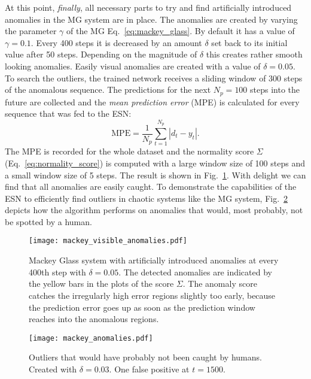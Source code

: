At this point, \emph{finally}, all necessary parts to try and find artificially
introduced anomalies in the MG system are in place. The anomalies are created
by varying the parameter $\gamma$ of the MG Eq.~\ref{eq:mackey_glass}.  By
default it has a value of $\gamma = 0.1$.  Every 400 steps it is decreased by
an amount $\delta$ set back to its initial value after 50 steps. Depending on
the magnitude of $\delta$ this creates rather smooth looking anomalies. Easily
visual anomalies are created with a value of $\delta = 0.05$. To search the
outliers, the trained network receives a sliding window of 300 steps of the
anomalous sequence.  The predictions for the next $N_p = 100$ steps into the
future are collected and the \emph{mean prediction error} (MPE) is calculated
for every sequence that was fed to the ESN:
\begin{equation}
  \text{MPE} = \frac{1}{N_p} \sum_{t=1}^{N_p} | d_t - y_t |.
\end{equation}
The MPE is recorded for the whole dataset and the normality score $\Sigma$
(Eq.~\ref{eq:normality_score}) is computed with a large window size of 100
steps and a small window size of 5 steps.  The result is shown in
Fig.~\ref{fig:mackey_visible_anomalies}. With delight we can find that all
anomalies are easily caught.  To demonstrate the capabilities of the ESN to
efficiently find outliers in chaotic systems like the MG system,
Fig.~\ref{fig:mackey_anomalies} depicts how the algorithm performs on
anomalies that would, most probably, not be spotted by a human.

\begin{figure}
  \centering
  \texttt{[image: mackey\_visible\_anomalies.pdf]}
  \caption{Mackey Glass system with artificially introduced anomalies at every
    400th step with $\delta=0.05$. The detected anomalies are indicated by the
    yellow bars in the plots of the score $\Sigma$. The anomaly score catches
    the irregularly high error regions slightly too early, because the
    prediction error goes up as soon as the prediction window reaches into the
  anomalous regions.}
  \label{fig:mackey_visible_anomalies}
\end{figure}

\begin{figure}
  \centering
  \texttt{[image: mackey\_anomalies.pdf]}
  \caption{Outliers that would have probably not been caught by humans. Created
  with $\delta = 0.03$. One false positive at $t=1500$.}
  \label{fig:mackey_anomalies}
\end{figure}

